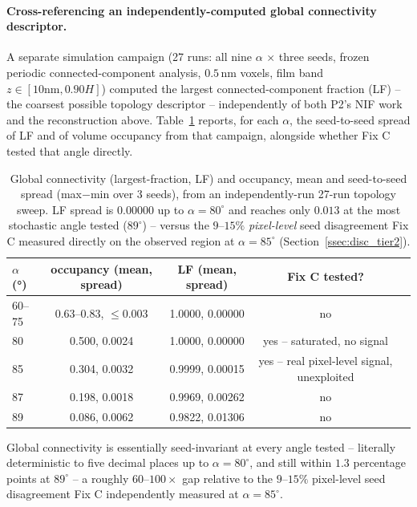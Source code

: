 \documentclass[aip,amsmath,amssymb,reprint]{revtex4-1}
\renewcommand{\ang}{\ensuremath{\alpha}} %
\begin{document}
\paragraph{Cross-referencing an independently-computed global connectivity descriptor.}
A separate simulation campaign (27 runs: all nine $\ang$ $\times$ three
seeds, frozen periodic connected-component analysis, $0.5$\,nm voxels,
film band $z\in[10\text{nm}, 0.90H]$) computed the largest connected-component
fraction (LF) -- the coarsest possible topology descriptor -- independently
of both P2's NIF work and the reconstruction above. Table~\ref{tab:topology_crossref}
reports, for each $\ang$, the seed-to-seed spread of LF and of volume
occupancy from that campaign, alongside whether Fix C tested that angle
directly.

\begin{table}[htbp]
  \centering
  \caption{%
    Global connectivity (largest-fraction, LF) and occupancy, mean and
    seed-to-seed spread (max$-$min over 3 seeds), from an independently-run
    27-run topology sweep. LF spread is $0.00000$ up to $\ang=80^{\circ}$ and
    reaches only $0.013$ at the most stochastic angle tested
    ($89^{\circ}$) -- versus the $9$--$15\%$ \emph{pixel-level} seed
    disagreement Fix C measured directly on the observed region at
    $\ang=85^{\circ}$ (Section~\ref{ssec:disc_tier2}).
  }
  \label{tab:topology_crossref}
  \begin{tabular}{lcccc}
    \toprule
    $\ang$ (°) & occupancy (mean, spread) & LF (mean, spread) & Fix C tested? \\
    \midrule
    60--75 & 0.63--0.83, $\leq$0.003 & 1.0000, 0.00000 & no \\
    80     & 0.500, 0.0024           & 1.0000, 0.00000 & yes -- saturated, no signal \\
    85     & 0.304, 0.0032           & 0.9999, 0.00015 & yes -- real pixel-level signal, unexploited \\
    87     & 0.198, 0.0018           & 0.9969, 0.00262 & no \\
    89     & 0.086, 0.0062           & 0.9822, 0.01306 & no \\
    \bottomrule
  \end{tabular}
\end{table}

Global connectivity is essentially seed-invariant at every angle tested --
literally deterministic to five decimal places up to $\ang=80^{\circ}$, and
still within $1.3$ percentage points at $89^{\circ}$ -- a roughly
$60$--$100\times$ gap relative to the $9$--$15\%$ pixel-level seed
disagreement Fix C independently measured at $\ang=85^{\circ}$.
\end{document}
